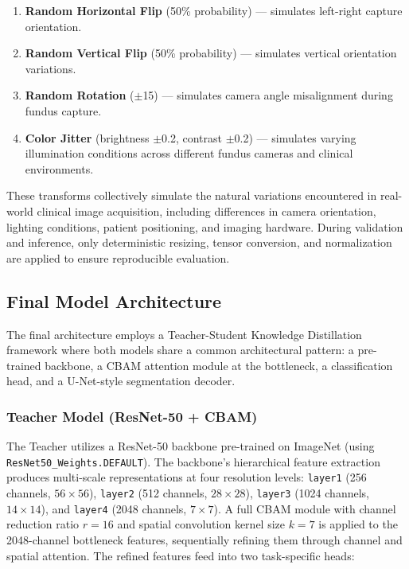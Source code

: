 \documentclass[conference]{IEEEtran}
\begin{document}
\begin{enumerate}
    \item \textbf{Random Horizontal Flip} (50\% probability) --- simulates left-right capture orientation.
    \item \textbf{Random Vertical Flip} (50\% probability) --- simulates vertical orientation variations.
    \item \textbf{Random Rotation} ($\pm$15\textdegree) --- simulates camera angle misalignment during fundus capture.
    \item \textbf{Color Jitter} (brightness $\pm$0.2, contrast $\pm$0.2) --- simulates varying illumination conditions across different fundus cameras and clinical environments.
\end{enumerate}

These transforms collectively simulate the natural variations encountered in real-world clinical image acquisition, including differences in camera orientation, lighting conditions, patient positioning, and imaging hardware. During validation and inference, only deterministic resizing, tensor conversion, and normalization are applied to ensure reproducible evaluation.

\subsection{Final Model Architecture}
The final architecture employs a Teacher-Student Knowledge Distillation framework where both models share a common architectural pattern: a pre-trained backbone, a CBAM attention module at the bottleneck, a classification head, and a U-Net-style segmentation decoder.

\subsubsection{Teacher Model (ResNet-50 + CBAM)}
The Teacher utilizes a ResNet-50 backbone pre-trained on ImageNet (using \texttt{ResNet50\_Weights.DEFAULT}). The backbone's hierarchical feature extraction produces multi-scale representations at four resolution levels: \texttt{layer1} (256 channels, $56{\times}56$), \texttt{layer2} (512 channels, $28{\times}28$), \texttt{layer3} (1024 channels, $14{\times}14$), and \texttt{layer4} (2048 channels, $7{\times}7$). A full CBAM module with channel reduction ratio $r{=}16$ and spatial convolution kernel size $k{=}7$ is applied to the 2048-channel bottleneck features, sequentially refining them through channel and spatial attention. The refined features feed into two task-specific heads:
\end{document}
